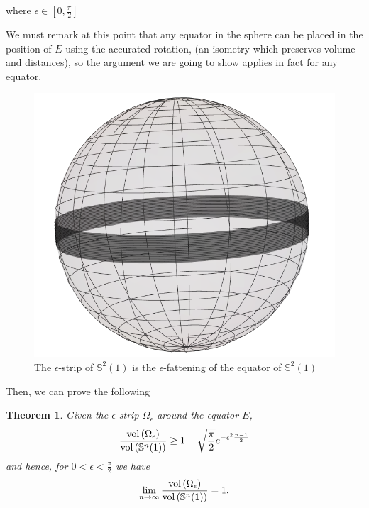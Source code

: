 \documentclass{amsart}
\newtheorem{theoremA}{Theorem}
\theoremstyle{definition}
\theoremstyle{remark}
\begin{document}
\noindent where $\epsilon \in [0,\frac{\pi}{2}]$

We must remark at this point that any equator in the sphere can be placed in the position of $E$ using the accurated rotation, (an isometry which preserves volume and distances), so the argument we are going to show applies in fact for any equator.


\begin{center}
\begin{figure}
    \centering
    \includegraphics[scale=0.35]{banda}
    \caption{The $\epsilon$-strip of $\mathbb{S}^2(1)$ is the $\epsilon$-fattening of the equator of $\mathbb{S}^2(1)$}\label{fig:e-strip}
\end{figure}
\end{center}

Then, we can prove the following
\begin{theoremA}\label{equator}
Given the $\epsilon$-strip $\Omega_\epsilon$ around the equator $E$, 
\begin{equation}\label{eq2.5}
\frac{{\rm vol}\left(\Omega_\epsilon\right)}{{\rm vol}\left(\mathbb{S}^n(1)\right)}\geq 1-\sqrt{\frac{\pi}{2}}e^{-\epsilon^2\frac{n-1}{2}}
\end{equation}
 and hence, for $0<\epsilon<\frac{\pi}{2}$ we have
\begin{equation}\label{eq2.5.1}
\lim_{n\to \infty}\frac{{\rm vol}\left(\Omega_\epsilon\right)}{{\rm vol}\left(\mathbb{S}^n(1)\right)}=1.
\end{equation}
\end{theoremA}
\end{document}
